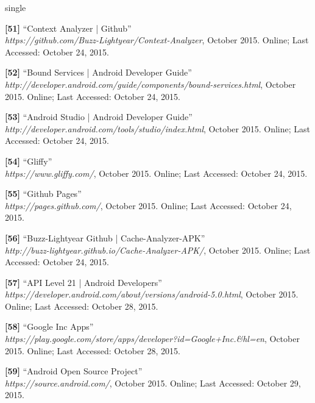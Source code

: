 \documentclass[12pt]{uthesis-v12}  %
\begin{document}
\begin{referencelist}{single}
	\item \textbf{[51]} ``Context Analyzer | Github''
	\\\emph{https://github.com/Buzz-Lightyear/Context-Analyzer}, October 2015. 
	Online; Last Accessed: October 24, 2015.
	
	\item \textbf{[52]} ``Bound Services | Android Developer Guide''
	\\\emph{http://developer.android.com/guide/components/bound-services.html}, October 2015. 
	Online; Last Accessed: October 24, 2015.	
	
	\item \textbf{[53]} ``Android Studio | Android Developer Guide''
	\\\emph{http://developer.android.com/tools/studio/index.html}, October 2015. 
	Online; Last Accessed: October 24, 2015.
											
	\item \textbf{[54]} ``Gliffy''
	\\\emph{https://www.gliffy.com/}, October 2015. 
	Online; Last Accessed: October 24, 2015.
							
	\item \textbf{[55]} ``Github Pages''
	\\\emph{https://pages.github.com/}, October 2015. 
	Online; Last Accessed: October 24, 2015.
	
	\item \textbf{[56]} ``Buzz-Lightyear Github | Cache-Analyzer-APK''
	\\\emph{http://buzz-lightyear.github.io/Cache-Analyzer-APK/}, October 2015. 
	Online; Last Accessed: October 24, 2015.
	
	\item \textbf{[57]} ``API Level 21 | Android Developers''
	\\\emph{https://developer.android.com/about/versions/android-5.0.html}, October 2015. 
	Online; Last Accessed: October 28, 2015.	
	
	\item \textbf{[58]} ``Google Inc Apps''
	\\\emph{https://play.google.com/store/apps/developer?id=Google+Inc.\&hl=en}, October 2015. 
	Online; Last Accessed: October 28, 2015.
											
	\item \textbf{[59]} ``Android Open Source Project''
	\\\emph{https://source.android.com/}, October 2015. 
	Online; Last Accessed: October 29, 2015.


\end{referencelist}
\end{document}
